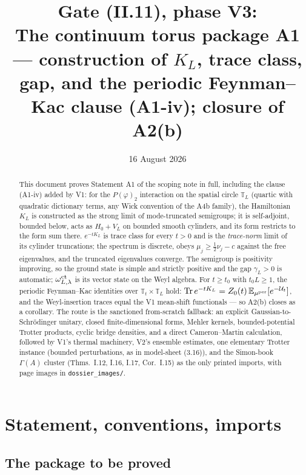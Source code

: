 \documentclass[11pt,a4paper]{article}
\title{Gate (II.11), phase V3:\\[4pt]
\large The continuum torus package A1 --- construction of $K_L$, trace
class, gap, and the periodic Feynman--Kac clause (A1-iv); closure of A2(b)}
\author{}
\date{16 August 2026}
\theoremstyle{plain}
\theoremstyle{definition}
\newcommand{\T}{\mathbb{T}}
\newcommand{\E}{\mathbb{E}}
\newcommand{\U}{\mathcal U}
\newcommand{\Trace}{\mathrm{Tr}}
\newcommand{\Gam}{\Gamma}
\begin{document}
\maketitle

\begin{abstract}
This document proves Statement A1 of the scoping note in full, including the
clause (A1-iv) added by V1: for the $P(\varphi)_2$ interaction on the spatial
circle $\T_L$ (quartic with quadratic dictionary terms, any Wick convention of
the A4b family), the Hamiltonian $K_L$ is constructed as the strong limit of
mode-truncated semigroups; it is self-adjoint, bounded below, acts as
$H_0+V_L$ on bounded smooth cylinders, and its form restricts to the form sum
there. $e^{-tK_L}$ is trace class for every $t>0$ and is the
\emph{trace-norm} limit of its cylinder truncations; the spectrum is
discrete, obeys $\mu_j\ge\tfrac12\nu_j-c$ against the free eigenvalues, and
the truncated eigenvalues converge. The semigroup is positivity improving,
so the ground state is simple and strictly positive and the gap
$\gamma_L>0$ is automatic; $\omega^{\rm ct}_{L,\lambda}$ is its vector state
on the Weyl algebra. For $t\ge t_0$ with $t_0L\ge1$, the periodic Feynman--Kac identities over
$\T_t\times\T_L$ hold: $\Trace\,e^{-tK_L}=Z_0(t)\,
\E_{\mu^{\rm per}}[e^{-\U_t}]$, and the Weyl-insertion traces equal the V1
mean-shift functionals --- so A2(b) closes as a corollary. The route is the
sanctioned from-scratch fallback: an explicit Gaussian-to-Schr\"odinger
unitary, closed finite-dimensional forms, Mehler kernels, bounded-potential
Trotter products, cyclic bridge densities, and a direct Cameron--Martin
calculation, followed by V1's thermal machinery, V2's ensemble estimates, one elementary
Trotter instance (bounded perturbations, as in model-sheet (3.16)), and the
Simon-book $\Gam(A)$ cluster (Thms.\ I.12, I.16, I.17, Cor.\ I.15) as the
only printed imports, with page images in \texttt{dossier\_images/}.
\end{abstract}

\tableofcontents

\section{Statement, conventions, imports}\label{sec:setup}

\subsection{The package to be proved}
\end{document}
